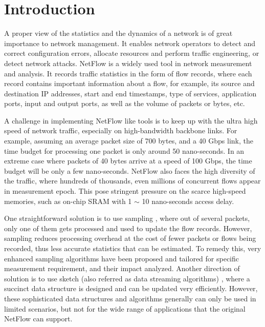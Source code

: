 \section{Introduction}
\label{section:introduction}
A proper view of the statistics and the dynamics of a network is of great importance to network management.
It enables network operators to detect and correct configuration errors, 
allocate resources and perform  traffic engineering, or detect network attacks. 
NetFlow\cite{claise_cisco_2004} is a widely used tool in network measurement and analysis.
It records traffic statistics in the form of flow records, where each record contains important 
information about a flow, for example, its source and destination IP addresses, 
start and end timestamps,  type of services, application ports, input and output ports, 
as well as the volume of packets or bytes, etc. 

A challenge in implementing NetFlow like tools is to keep up with the ultra high speed 
of network traffic, especially on high-bandwidth backbone links. For example, assuming an 
average packet size of 700 bytes, and a 40 Gbps link, the time budget for processing 
one packet is only around 50 nano-seconds\cite{zhang_more_2017}\cite{zhang_more_2015}\cite{wang_efficient_2019}.
 In an extreme case where packets of 40 bytes 
arrive at a speed of 100 Gbps, the time budget will be only a few nano-seconds. 
NetFlow also faces the high diversity of the traffic, where hundreds of thousands, 
even millions of concurrent flows appear in measurement epoch. This pose stringent 
pressure on the scarce high-speed memories, such as on-chip SRAM with 1 $\sim$ 10 nano-seconds 
access delay\cite{li_flowradar:_2016}\cite{noauthor_access_nodate}.

One straightforward solution is to use sampling \cite{noauthor_sampled_nodate}, 
where out of several packets, only one of them gets processed and used to update the flow records.
However, sampling reduces processing overhead at the cost of fewer packets or flows being recorded, 
thus less accurate statistics that can be estimated. To remedy this, very enhanced sampling algorithms
\cite{hohn_inverting_2003}\cite{duffield_estimating_2005}\cite{tune_towards_2008}
have been proposed and tailored for specific measurement requirement, 
and their impact analyzed\cite{duffield2004}\cite{SamplingImpact}.
Another direction of solution is to use sketch (also referred as data streaming algorithms)
\cite{DataStreams2005}\cite{huang_sketchvisor:_2017}\cite{chen_counter_2017},
where a succinct data structure is designed and can be updated very efficiently. 
However, these sophisticated data structures and algorithms generally can only be used in limited scenarios, 
but not for the wide range of applications that the original NetFlow can support.

